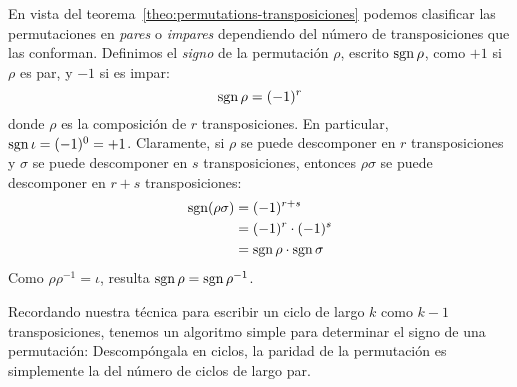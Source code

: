   En vista del teorema~\ref{theo:permutations-transposiciones}
  podemos clasificar las permutaciones
  en \emph{pares} o \emph{impares}%
  dependiendo del número de transposiciones que las conforman.
  Definimos el \emph{signo} de la permutación \(\rho\),%
  escrito \(\operatorname{sgn} \rho\),
  como	\(+1\) si \(\rho\) es par,
  y \(-1\) si es impar:
  \begin{equation*}
    \operatorname{sgn} \rho = (-1)^r
  \end{equation*}
  donde \(\rho\) es la composición de \(r\) transposiciones.
  En particular,
  \(\operatorname{sgn} \iota = (-1)^0 = +1\).
  Claramente,
  si \(\rho\) se puede descomponer en \(r\) transposiciones
  y \(\sigma\) se puede descomponer en \(s\) transposiciones,
  entonces \(\rho \sigma\)
  se puede descomponer en \(r + s\) transposiciones:
  \begin{align*}
    \operatorname{sgn} (\rho \sigma)
       &= (-1)^{r + s} \\
       &= (-1)^r \cdot (-1)^s \\
       &= \operatorname{sgn} \rho \cdot \operatorname{sgn} \sigma
  \end{align*}
  Como \(\rho \rho^{-1} = \iota\),
  resulta \(\operatorname{sgn} \rho = \operatorname{sgn} \rho^{-1}\).

  Recordando nuestra técnica para escribir
  un ciclo de largo \(k\) como \(k - 1\) transposiciones,
  tenemos un algoritmo simple
  para determinar el signo de una permutación:
  Descompóngala en ciclos,
  la paridad de la permutación
  es simplemente la del número de ciclos de largo par.%

